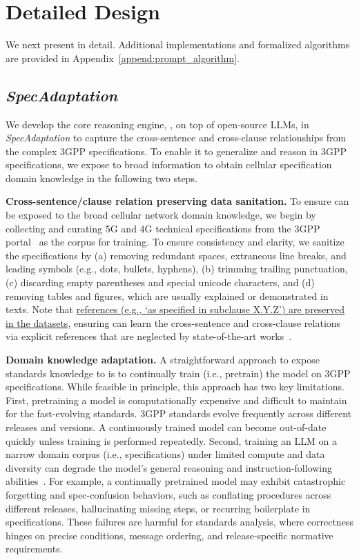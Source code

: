 \section{Detailed Design}
\label{sect:design}

We next present \lm in detail. Additional implementations and formalized algorithms are provided in Appendix~\ref{append:prompt_algorithm}.


\subsection{\textit{SpecAdaptation}}
We develop the core reasoning engine, \core, on top of open-source LLMs, in \textit{SpecAdaptation} to capture the cross-sentence and cross-clause relationships from the complex 3GPP specifications. To enable it to generalize and reason in 3GPP specifications, we expose \core to broad information to obtain cellular specification domain knowledge in the following two steps. 

\noindent \textbf{Cross-sentence/clause relation preserving data sanitation.} 
To ensure \core can be exposed to the broad cellular network domain knowledge, we begin by collecting and curating 5G and 4G technical specifications from the 3GPP portal~\cite{3GPP_Specs_2025} as the corpus for training. To ensure consistency and clarity, we sanitize the specifications by (a) removing redundant spaces, extraneous line breaks, and leading symbols (e.g., dots, bullets, hyphens), (b) trimming trailing punctuation, (c) discarding empty parentheses and special unicode characters, and (d) removing tables and figures, which are usually explained or demonstrated in texts. Note that \ul{references (e.g., `as specified
in subclause X.Y.Z') are preserved in the datasets}, ensuring \core can learn the cross-sentence and cross-clause relations via explicit references that are neglected by state-of-the-art works~\cite{rahman2024cellularlint}. 
 

\noindent \textbf{Domain knowledge adaptation.} A straightforward approach to expose standards knowledge to \core is to continually train (i.e., pretrain) the model on 3GPP specifications. While feasible in principle, this approach has two key limitations. 
First, pretraining a model is computationally expensive and difficult to maintain for the fast-evolving standards. 3GPP standards evolve frequently across different releases and versions. A continuously trained model can become out-of-date quickly unless training is performed repeatedly. Second, training an LLM on a narrow domain corpus (i.e., specifications) under limited compute and data diversity can degrade the model's general reasoning and instruction-following abilities~\cite{gururangan2020don, kemker2018measuring, ouyang2022training}. For example, a continually pretrained model may exhibit catastrophic forgetting and spec-confusion behaviors, such as conflating procedures across different releases, hallucinating missing steps, or recurring boilerplate in specifications. These failures are harmful for standards analysis, where correctness hinges on precise conditions, message ordering, and release-specific normative requirements.

